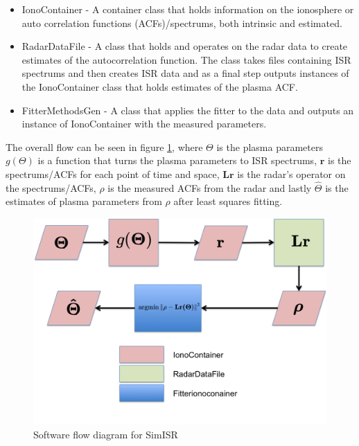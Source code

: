 \begin{itemize} 
\item IonoContainer - A container class that holds information on the ionosphere or auto correlation functions (ACFs)/spectrums, both intrinsic and estimated.

\item RadarDataFile - A class that holds and operates on the radar data to create estimates of the autocorrelation function. The class takes files containing ISR spectrums and then creates ISR data and as a final step outputs instances of the IonoContainer class that holds estimates of the plasma ACF.

\item FitterMethodsGen - A class that applies the fitter to the data and outputs an instance of IonoContainer with the measured parameters. 
\end{itemize}

The overall flow can be seen in figure \ref{fig:swflow}, where  $\Theta$ is the plasma parameters $ g(\Theta)$ is a function that turns the plasma parameters to ISR spectrums, $ \mathbf{r}$ is the spectrums/ACFs for each point of time and space, $ \mathbf{Lr}$ is the radar's operator on the spectrums/ACFs, $ \rho$ is the measured ACFs from the radar and lastly $ \hat{\Theta}$ is the estimates of plasma parameters from $ \rho$ after least squares fitting.

\begin{figure}[h!]
\centering
\includegraphics[width=6.0in]{softwareflowandmath}
\caption{Software flow diagram for SimISR}
\label{fig:swflow}
\end{figure}


